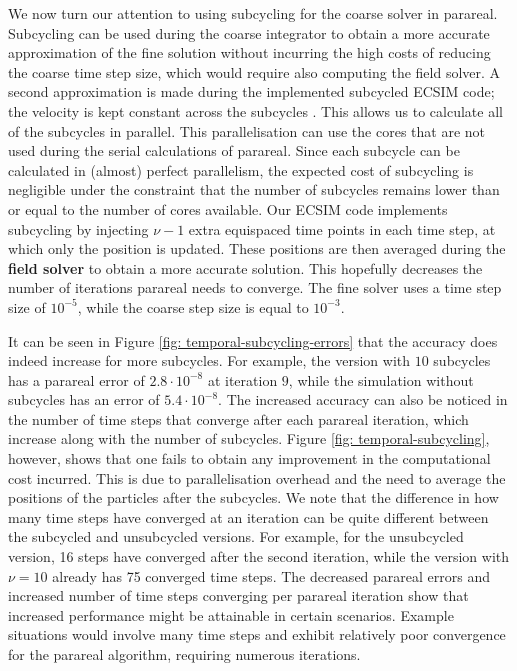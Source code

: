 We now turn our attention to using subcycling for the coarse solver in parareal. Subcycling can be used during the coarse integrator to obtain a more accurate approximation of the fine solution without incurring the high costs of reducing the coarse time step size, which would require also computing the field solver. A second approximation is made during the implemented subcycled ECSIM code; the velocity is kept constant across the subcycles \cite{lapenta_advances_2023}. This allows us to calculate all of the subcycles in parallel. This parallelisation can use the cores that are not used during the serial calculations of parareal. Since each subcycle can be calculated in (almost) perfect parallelism, the expected cost of subcycling is negligible under the constraint that the number of subcycles remains lower than or equal to the number of cores available. Our ECSIM code implements subcycling by injecting $\nu-1$ extra equispaced time points in each time step, at which only the position is updated. These positions are then averaged during the \textbf{field solver} to obtain a more accurate solution. This hopefully decreases the number of iterations parareal needs to converge. The fine solver uses a time step size of $10^{-5}$, while the coarse step size is equal to $10^{-3}$.

It can be seen in Figure \ref{fig: temporal-subcycling-errors} that the accuracy does indeed increase for more subcycles. For example, the version with $10$ subcycles has a parareal error of $2.8\cdot 10^{-8}$ at iteration $9$, while the simulation without subcycles has an error of $5.4\cdot 10^{-8}$. The increased accuracy can also be noticed in the number of time steps that converge after each parareal iteration, which increase along with the number of subcycles. Figure \ref{fig: temporal-subcycling}, however, shows that one fails to obtain any improvement in the computational cost incurred. This is due to parallelisation overhead and the need to average the positions of the particles after the subcycles. We note that the difference in how many time steps have converged at an iteration can be quite different between the subcycled and unsubcycled versions. For example, for the unsubcycled version, 16 steps have converged after the second iteration, while the version with $\nu = 10$ already has 75 converged time steps. The decreased parareal errors and increased number of time steps converging per parareal iteration show that increased performance might be attainable in certain scenarios. Example situations would involve many time steps and exhibit relatively poor convergence for the parareal algorithm, requiring numerous iterations.

